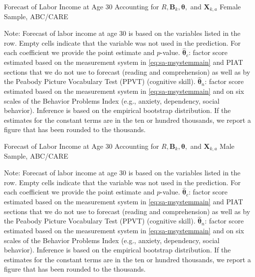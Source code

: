 \begin{table}
\begin{threeparttable}
\caption{Forecast of Labor Income at Age 30 Accounting for $R, \bm{B}_k, \bm{\theta},$ and $\bm{X}_{k,a}$ Female Sample, ABC/CARE}
\label{table:end2}
\centering
\scriptsize

\begin{tablenotes}
\footnotesize
\item Note: Forecast of labor income at age 30 is based on the variables listed in the row. Empty cells indicate that the variable was not used in the prediction. For each coefficient we provide the point estimate and $p$-value. $\hat{\bm{\theta}}_{c}$: factor score estimated based on the measurement system in \eqref{eq:sa-msystemmain} and PIAT sections that we do not use to forecast (reading and comprehension) as well as by the Peabody Picture Vocabulary Test (PPVT) (cognitive skill). $\hat{\bm{\theta}}_{n}$: factor score estimated based on the measurement system in \eqref{eq:sa-msystemmain} and on six scales of the Behavior Problems Index (e.g., anxiety, dependency, social behavior). Inference is based on the empirical bootstrap distribution. If the estimates for the constant terms are in the ten or hundred thousands, we report a figure that has been rounded to the thousands.
\end{tablenotes}
\end{threeparttable}
\end{table}

\begin{table}
\begin{threeparttable}
\caption{Forecast of Labor Income at Age 30 Accounting for $R, \bm{B}_k, \bm{\theta},$ and $\bm{X}_{k,a}$ Male Sample, ABC/CARE}
\label{table:end2}
\centering
\scriptsize

\begin{tablenotes}
\footnotesize
\item Note: Forecast of labor income at age 30 is based on the variables listed in the row. Empty cells indicate that the variable was not used in the prediction. For each coefficient we provide the point estimate and $p$-value. $\hat{\bm{\theta}}_{c}$: factor score estimated based on the measurement system in \eqref{eq:sa-msystemmain} and PIAT sections that we do not use to forecast (reading and comprehension) as well as by the Peabody Picture Vocabulary Test (PPVT) (cognitive skill). $\hat{\bm{\theta}}_{n}$: factor score estimated based on the measurement system in \eqref{eq:sa-msystemmain} and on six scales of the Behavior Problems Index (e.g., anxiety, dependency, social behavior). Inference is based on the empirical bootstrap distribution. If the estimates for the constant terms are in the ten or hundred thousands, we report a figure that has been rounded to the thousands.
\end{tablenotes}
\end{threeparttable}
\end{table}



